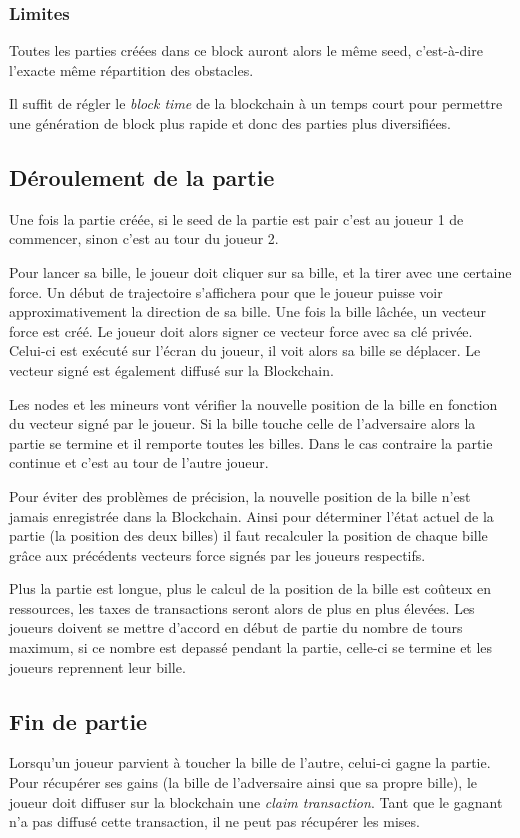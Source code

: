 \documentclass{article}
\begin{document}
\subsubsection{Limites}
Toutes les parties créées dans ce block auront alors le même seed, c'est-à-dire l'exacte même répartition des obstacles.  

Il suffit de régler le \textit{block time} de la blockchain à un temps court pour permettre une génération de block plus rapide et donc des parties plus diversifiées. 

\subsection{Déroulement de la partie}
Une fois la partie créée, si le seed de la partie est pair c'est au joueur 1 de commencer, sinon c'est au tour du joueur 2.

Pour lancer sa bille, le joueur doit cliquer sur sa bille, et la tirer avec une certaine force. Un début de trajectoire s'affichera pour que le joueur puisse voir approximativement la direction de sa bille.
Une fois la bille lâchée, un vecteur force est créé. Le joueur doit alors signer ce vecteur force avec sa clé privée. Celui-ci est exécuté sur l'écran du joueur, il voit alors sa bille se déplacer. Le vecteur signé est également diffusé sur la Blockchain.

Les nodes et les mineurs vont vérifier la nouvelle position de la bille en fonction du vecteur signé par le joueur. Si la bille touche celle de l'adversaire alors la partie se termine et il remporte toutes les billes. Dans le cas contraire la partie continue et c'est au tour de l'autre joueur.

Pour éviter des problèmes de précision, la nouvelle position de la bille n'est jamais enregistrée dans la Blockchain. Ainsi pour déterminer l'état actuel de la partie (la position des deux billes) il faut recalculer la position de chaque bille grâce aux précédents vecteurs force signés par les joueurs respectifs.

Plus la partie est longue, plus le calcul de la position de la bille est coûteux en ressources, les taxes de transactions seront alors de plus en plus élevées. Les joueurs doivent se mettre d'accord en début de partie du nombre de tours maximum, si ce nombre est depassé pendant la partie, celle-ci se termine et les joueurs reprennent leur bille.

\subsection{Fin de partie}
Lorsqu'un joueur parvient à toucher la bille de l'autre, celui-ci gagne la partie. Pour récupérer ses gains (la bille de l'adversaire ainsi que sa propre bille), le joueur doit diffuser sur la blockchain une \textit{claim transaction}. Tant que le gagnant n'a pas diffusé cette transaction, il ne peut pas récupérer les mises.
\end{document}
